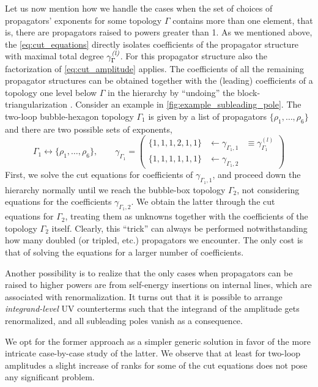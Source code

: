 {Let us now mention how we handle
the cases when the set of choices of propagators' exponents for some topology $\Gamma$
contains more than one element, that is, there are propagators raised to powers greater than 1.
As we mentioned above, the \cref{eq:cut_equations} directly isolates coefficients of 
the propagator structure with maximal total degree ${\gamma^{\textit{(l)}}_{\Gamma}}$. For this propagator structure
also the factorization of \cref{eq:cut_amplitude} applies.
The coefficients of all the remaining propagator structures can be obtained together with the (leading) coefficients  of a topology one level below
$\Gamma$ in the hierarchy by ``undoing'' the block-triangularization \cite{Abreu:2017idw}.
Consider an example in \cref{fig:example_subleading_pole}.
The two-loop bubble-hexagon topology $\Gamma_1$ is given by a list of propagators $\{\rho_1,\ldots{},\rho_6\}$ and there are two
possible sets of exponents,
\[
  \Gamma_1 \leftrightarrow  \{\rho_1,\ldots{},\rho_6\}, \qquad \gamma_{\Gamma_1} =  
  \begin{pmatrix} 
    \{1,1,1,2,1,1\} &\leftarrow \gamma_{{\Gamma_1},1}  & \equiv \gamma_{\Gamma_1}^{(\textit{l})} \\ 
    \{1,1,1,1,1,1\} &\leftarrow \gamma_{{\Gamma_1},2} &
  \end{pmatrix}
\]
First, we solve the cut equations for coefficients of $\gamma_{{\Gamma_1},1}$, and proceed down the hierarchy normally until we reach
the bubble-box topology $\Gamma_2$, not considering equations for the coefficients $\gamma_{{\Gamma_1},2}$.
We obtain the latter through the cut equations for $\Gamma_2$, treating them as unknowns together with 
the coefficients of the topology $\Gamma_2$ itself. Clearly, this ``trick'' can always be performed
notwithstanding how many doubled (or tripled, etc.\@) propagators we encounter.
The only cost is that of solving the equations for a larger number of coefficients.

Another possibility is to realize that the only cases when propagators can be raised to higher powers 
are from self-energy insertions on internal lines, which are associated with renormalization.
It turns out \cite{Baumeister:2019rmh} that
it is possible to arrange \emph{integrand-level} UV counterterms such that
the integrand of the amplitude gets renormalized,
and all subleading poles vanish as a consequence.

We opt for the former approach as a simpler generic solution in favor of the
more intricate case-by-case study of the latter.
We observe that at least for two-loop
amplitudes a slight increase of ranks for some of the cut equations does not
pose any significant problem.

}
